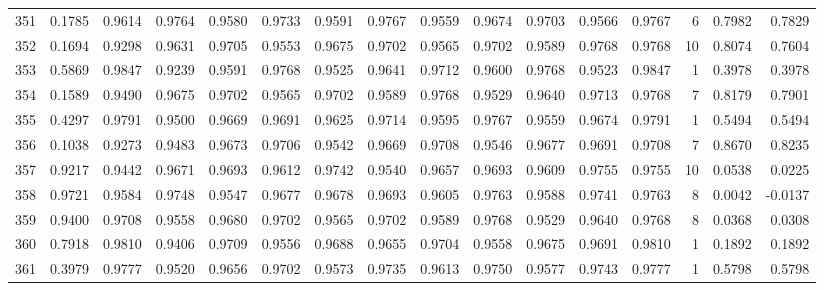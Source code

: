 \begin{tabular}{lrrrrrrrrrrrrrrr}
351 &      0.1785 &  0.9614 &  0.9764 &  0.9580 &  0.9733 &  0.9591 &  0.9767 &  0.9559 &  0.9674 &  0.9703 &   0.9566 &     0.9767 &      6 &                    0.7982 &                     0.7829 \\
352 &      0.1694 &  0.9298 &  0.9631 &  0.9705 &  0.9553 &  0.9675 &  0.9702 &  0.9565 &  0.9702 &  0.9589 &   0.9768 &     0.9768 &     10 &                    0.8074 &                     0.7604 \\
353 &      0.5869 &  0.9847 &  0.9239 &  0.9591 &  0.9768 &  0.9525 &  0.9641 &  0.9712 &  0.9600 &  0.9768 &   0.9523 &     0.9847 &      1 &                    0.3978 &                     0.3978 \\
354 &      0.1589 &  0.9490 &  0.9675 &  0.9702 &  0.9565 &  0.9702 &  0.9589 &  0.9768 &  0.9529 &  0.9640 &   0.9713 &     0.9768 &      7 &                    0.8179 &                     0.7901 \\
355 &      0.4297 &  0.9791 &  0.9500 &  0.9669 &  0.9691 &  0.9625 &  0.9714 &  0.9595 &  0.9767 &  0.9559 &   0.9674 &     0.9791 &      1 &                    0.5494 &                     0.5494 \\
356 &      0.1038 &  0.9273 &  0.9483 &  0.9673 &  0.9706 &  0.9542 &  0.9669 &  0.9708 &  0.9546 &  0.9677 &   0.9691 &     0.9708 &      7 &                    0.8670 &                     0.8235 \\
357 &      0.9217 &  0.9442 &  0.9671 &  0.9693 &  0.9612 &  0.9742 &  0.9540 &  0.9657 &  0.9693 &  0.9609 &   0.9755 &     0.9755 &     10 &                    0.0538 &                     0.0225 \\
358 &      0.9721 &  0.9584 &  0.9748 &  0.9547 &  0.9677 &  0.9678 &  0.9693 &  0.9605 &  0.9763 &  0.9588 &   0.9741 &     0.9763 &      8 &                    0.0042 &                    -0.0137 \\
359 &      0.9400 &  0.9708 &  0.9558 &  0.9680 &  0.9702 &  0.9565 &  0.9702 &  0.9589 &  0.9768 &  0.9529 &   0.9640 &     0.9768 &      8 &                    0.0368 &                     0.0308 \\
360 &      0.7918 &  0.9810 &  0.9406 &  0.9709 &  0.9556 &  0.9688 &  0.9655 &  0.9704 &  0.9558 &  0.9675 &   0.9691 &     0.9810 &      1 &                    0.1892 &                     0.1892 \\
361 &      0.3979 &  0.9777 &  0.9520 &  0.9656 &  0.9702 &  0.9573 &  0.9735 &  0.9613 &  0.9750 &  0.9577 &   0.9743 &     0.9777 &      1 &                    0.5798 &                     0.5798 \\

\end{tabular}
